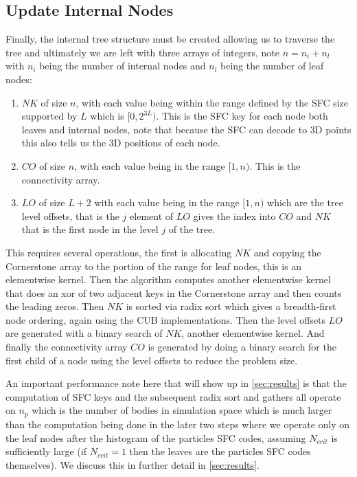 \subsection{Update Internal Nodes}
Finally, the internal tree structure must be created allowing us to traverse the tree and ultimately we are left with three arrays of integers, note $n = n_i + n_l$ with $n_i$ being the number of internal nodes and $n_l$ being the number of leaf nodes:
\begin{enumerate}
    \item $NK$ of size $n$, with each value being within the range defined by the SFC size supported by $L$ which is $[0,2^{3L})$. This is the SFC key for each node both leaves and internal nodes, note that because the SFC can decode to 3D points this also tells us the 3D positions of each node.
    \item $CO$ of size $n$, with each value being in the range $[1,n)$. This is the connectivity array.
    \item $LO$ of size $L + 2$ with each value being in the range $[1,n)$ which are the tree level offsets, that is the $j$ element of $LO$ gives the index into $CO$ and $NK$ that is the first node in the level $j$ of the tree.
\end{enumerate}

This requires several operations, the first is allocating $NK$ and copying the Cornerstone array to the portion of the range for leaf nodes, this is an elementwise kernel. Then the algorithm computes another elementwise kernel that does an xor of two adjacent keys in the Cornerstone array and then counts the leading zeros. Then $NK$ is sorted via radix sort which gives a breadth-first node ordering, again using the CUB implementations. Then the level offsets $LO$ are generated with a binary search of $NK$, another elementwise kernel. And finally the connectivity array $CO$ is generated by doing a binary search for the first child of a node using the level offsets to reduce the problem size.

An important performance note here that will show up in \ref{sec:results} is that the computation of SFC keys and the subsequent radix sort and gathers all operate on $n_p$ which is the number of bodies in simulation space which is much larger than the computation being done in the later two steps where we operate only on the leaf nodes after the histogram of the particles SFC codes, assuming $N_{crit}$ is sufficiently large (if $N_{crit} = 1$ then the leaves are the particles SFC codes themselves). We discuss this in further detail in \ref{sec:results}.

